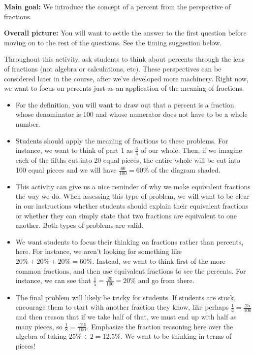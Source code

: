 \documentclass[nooutcomes,noauthor]{ximera}
\begin{document}
\begin{instructorNotes} 



{\bf Main goal:} We introduce the concept of a percent from the perspective of fractions.


{\bf Overall picture:} You will want to settle the answer to the first question before moving on to the rest of the questions. See the timing suggestion below. 

Throughout this activity, ask students to think about percents through the lens of fractions (not algebra or calculations, etc). These perspectives can be considered later in the course, after we've developed more machinery. Right now, we want to focus on percents just as an application of the meaning of fractions.

\begin{itemize}
	\item For the definition, you will want to draw out that a percent is a fraction whose denominator is 100 and whose numerator does not have to be a whole number. 
	\item Students should apply the meaning of fractions to these problems. For instance, we want to think of part 1 as $\frac35$ of our whole.  Then, if we imagine each of the fifths cut into 20 equal pieces, the entire whole will be cut into 100 equal pieces and we will have $\frac{60}{100} = 60\%$ of the diagram shaded.
	\item This activity can give us a nice reminder of why we make equivalent fractions the way we do. When assessing this type of problem, we will want to be clear in our instructions whether students should explain their equivalent fractions or whether they can simply state that two fractions are equivalent to one another. Both types of problems are valid.
	\item We want students to focus their thinking on fractions rather than percents, here. For instance, we aren't looking for something like $20\% + 20\% + 20\%  = 60\%$. Instead, we want to think first of the more common fractions, and then use equivalent fractions to see the percents. For instance, we can see that $\frac{1}{5} = \frac{20}{100} = 20\%$ and go from there.
	\item The final problem will likely be tricky for students. If students are stuck, encourage them to start with another fraction they know, like perhaps $\frac{1}{4} = \frac{25}{100}$ and then reason that if we take half of that, we must end up with half as many pieces, so $\frac{1}{8} = \frac{12.5}{100}$. Emphasize the fraction reasoning here over the algebra of taking $25\% \div 2 = 12.5\%$. We want to be thinking in terms of pieces!
\end{itemize}



\end{instructorNotes}
\end{document}
